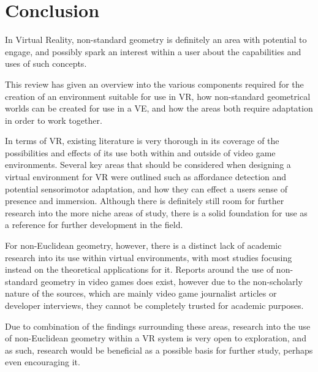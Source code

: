 \section{Conclusion}
\label{lr:conclusion}

	In Virtual Reality, non-standard geometry is definitely an area with potential to engage, and possibly spark an interest within a user about the capabilities and uses of such concepts.

	This review has given an overview into the various components required for the creation of an environment suitable for use in VR, how non-standard geometrical worlds can be created for use in a VE, and how the areas both require adaptation in order to work together.

	In terms of VR, existing literature is very thorough in its coverage of the possibilities and effects of its use both within and outside of video game environments.
	Several key areas that should be considered when designing a virtual environment for VR were outlined such as affordance detection and potential sensorimotor adaptation, and how they can effect a users sense of presence and immersion.
	Although there is definitely still room for further research into the more niche areas of study, there is a solid foundation for use as a reference for further development in the field.

	For non-Euclidean geometry, however, there is a distinct lack of academic research into its use within virtual environments, with most studies focusing instead on the theoretical applications for it.
	Reports around the use of non-standard geometry in video games does exist, however due to the non-scholarly nature of the sources, which are mainly video game journalist articles or developer interviews, they cannot be completely trusted for academic purposes.

	Due to combination of the findings surrounding these areas, research into the use of non-Euclidean geometry within a VR system is very open to exploration, and as such, research would be beneficial as a possible basis for further study, perhaps even encouraging it.
